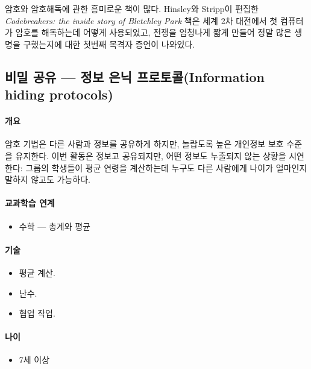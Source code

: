 \documentclass[]{article}
\begin{document}
암호와 암호해독에 관한 흥미로운 책이 많다. Hinsley와 Stripp이 편집한
\emph{Codebreakers: the inside story of Bletchley Park} 책은 세계 2차
대전에서 첫 컴퓨터가 암호를 해독하는데 어떻게 사용되었고, 전쟁을
엄청나게 짧게 만들어 정말 많은 생명을 구했는지에 대한 첫번째 목격자
증언이 나와있다.

\subsection{비밀 공유 --- 정보 은닉 프로토콜(Information hiding
protocols)}\label{mdash---information-hiding-protocols}

\mbox{}\paragraph{개요}\label{section-225}

암호 기법은 다른 사람과 정보를 공유하게 하지만, 놀랍도록 높은 개인정보
보호 수준을 유지한다. 이번 활동은 정보고 공유되지만, 어떤 정보도
누출되지 않는 상황을 시연한다: 그룹의 학생들이 평균 연령을 계산하는데
누구도 다른 사람에게 나이가 얼마인지 말하지 않고도 가능하다.

\mbox{}\paragraph{교과학습 연계}\label{section-226}

\begin{itemize}
\itemsep1pt\parskip0pt
\item
  수학 --- 총계와 평균
\end{itemize}

\mbox{}\paragraph{기술}\label{section-227}

\begin{itemize}
\itemsep1pt\parskip0pt
\item
  평균 계산.
\item
  난수.
\item
  협업 작업.
\end{itemize}

\mbox{}\paragraph{나이}\label{section-228}

\begin{itemize}
\itemsep1pt\parskip0pt
\item
  7세 이상
\end{itemize}
\end{document}
